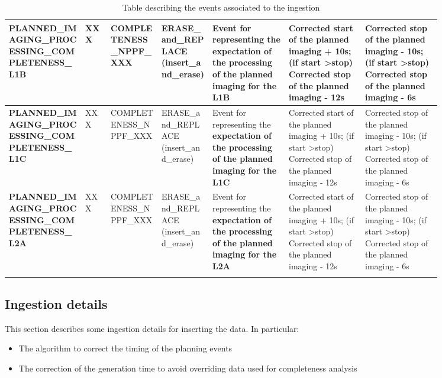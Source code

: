 \begin{landscape}
\begin{longtable}{|M{0.15\linewidth}|M{0.05\linewidth}|M{0.10\linewidth}|M{0.10\linewidth}|M{0.15\linewidth}|M{0.15\linewidth}|M{0.15\linewidth}|}
\textbf{PLANNED\_IMAGING\_PROCESSING\_COMPLETENESS\_L1B} & XXX & \- COMPLETENESS\_NPPF\_XXX & ERASE\_and\_REPLACE (insert\_and\_erase) & Event for representing the \textbf{expectation of the processing of the planned imaging for the L1B} & Corrected start of the planned imaging + 10s; (if start \textgreater  stop) Corrected stop of the planned imaging - 12s & Corrected stop of the planned imaging - 10s; (if start \textgreater  stop) Corrected stop of the planned imaging - 6s \\ \hline
\textbf{PLANNED\_IMAGING\_PROCESSING\_COMPLETENESS\_L1C} & XXX & \- COMPLETENESS\_NPPF\_XXX & ERASE\_and\_REPLACE (insert\_and\_erase) & Event for representing the \textbf{expectation of the processing of the planned imaging for the L1C} & Corrected start of the planned imaging + 10s; (if start \textgreater  stop) Corrected stop of the planned imaging - 12s & Corrected stop of the planned imaging - 10s; (if start \textgreater  stop) Corrected stop of the planned imaging - 6s \\ \hline
\textbf{PLANNED\_IMAGING\_PROCESSING\_COMPLETENESS\_L2A} & XXX & \- COMPLETENESS\_NPPF\_XXX & ERASE\_and\_REPLACE (insert\_and\_erase) & Event for representing the \textbf{expectation of the processing of the planned imaging for the L2A} & Corrected start of the planned imaging + 10s; (if start \textgreater  stop) Corrected stop of the planned imaging - 12s & Corrected stop of the planned imaging - 10s; (if start \textgreater  stop) Corrected stop of the planned imaging - 6s \\ \hline
\caption{Table describing the events associated to the ingestion}
\label{tb:description_events_ingestion_orbpre}
\end{longtable}
\end{landscape}

\subsection{Ingestion details}

This section describes some ingestion details for inserting the data. In particular:

\begin{itemize} 

\item The algorithm to correct the timing of the planning events

\item The correction of the generation time to avoid overriding data used for completeness analysis
  
\end{itemize}

